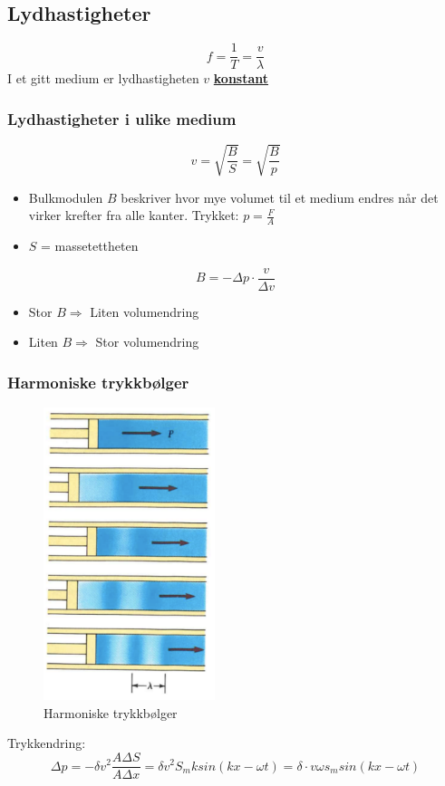 \documentclass[12pt]{article}
\begin{document}
\subsection{Lydhastigheter}
$$f = \frac{1}{T} = \frac{v}{\lambda}$$
I et gitt medium er lydhastigheten $v$ \underline{\textbf{konstant}}

\subsubsection{Lydhastigheter i ulike medium}
$$v=\sqrt{\frac{B}{S}} = \sqrt{\frac{B}{p}}$$
\begin{itemize}
    \item[] Bulkmodulen $B$ beskriver hvor mye volumet til et medium endres når det virker krefter fra alle kanter. Trykket: $p = \frac{F}{A}$ 
    \item[] $S$ = massetettheten
\end{itemize}
$$B = -\Delta p\cdot \frac{v}{\Delta v}$$
\begin{itemize}
    \item [] Stor $B \Rightarrow$ Liten volumendring
    \item [] Liten $B \Rightarrow$ Stor volumendring
\end{itemize}
\subsubsection{Harmoniske trykkbølger}
\begin{figure} [H]
    \centering
    \includegraphics[width = 5cm]{images/compress.png}
    \caption{Harmoniske trykkbølger}
\end{figure}
Trykkendring:
$$\Delta p = -\delta v^2\frac{A\Delta S}{A\Delta x} = \delta v^2 S_m k sin (kx-\omega t) = \delta\cdot v\omega s_m sin(kx-\omega t)$$
\end{document}
